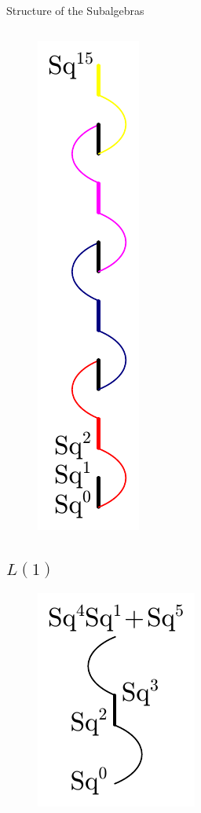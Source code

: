 \documentclass[final]{beamer}
\begin{document}
\begin{columns}[T]
\begin{column}{0.495\textwidth}
\begin{section}{Structure of the Subalgebras}
\begin{columns}[T]
\begin{column}{0.66\textwidth}
\begin{figure}
\begin{center}
                \hspace{-0.5in}\includegraphics[scale=2]{pics/L1-1.pdf}
              \end{center}
            \end{figure}
            \subsection{$L(1)$}
            \parbox{0.85\textwidth}{
              \begin{figure}
                \begin{center}
                  \includegraphics[scale=2]{pics/A1-A0.pdf}
                \end{center}
              \end{figure}

}
\end{column}
\end{columns}
\end{section}
\end{column}
\end{columns}
\end{document}
